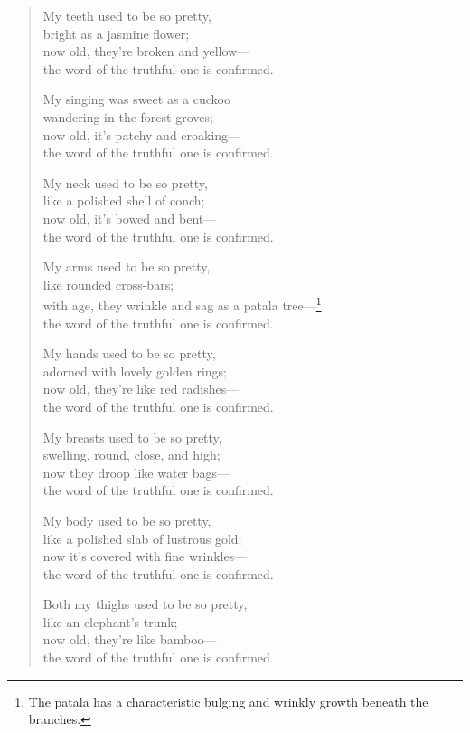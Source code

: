 \documentclass[12pt,openany]{book}%
\begin{document}
\begin{verse}
My teeth used to be so pretty, \\
bright as a jasmine flower; \\
now old, they’re broken and yellow—\\
the word of the truthful one is confirmed. 

My singing was sweet as a cuckoo \\
wandering in the forest groves; \\
now old, it’s patchy and croaking—\\
the word of the truthful one is confirmed. 

My neck used to be so pretty, \\
like a polished shell of conch; \\
now old, it’s bowed and bent—\\
the word of the truthful one is confirmed. 

My arms used to be so pretty, \\
like rounded cross-bars; \\
with age, they wrinkle and sag as a patala tree—\footnote{The patala has a characteristic bulging and wrinkly growth beneath the branches. } \\
the word of the truthful one is confirmed. 

My hands used to be so pretty, \\
adorned with lovely golden rings; \\
now old, they’re like red radishes—\\
the word of the truthful one is confirmed. 

My breasts used to be so pretty, \\
swelling, round, close, and high; \\
now they droop like water bags—\\
the word of the truthful one is confirmed. 

My body used to be so pretty, \\
like a polished slab of lustrous gold; \\
now it’s covered with fine wrinkles—\\
the word of the truthful one is confirmed. 

Both my thighs used to be so pretty, \\
like an elephant’s trunk; \\
now old, they’re like bamboo—\\
the word of the truthful one is confirmed. 


\end{verse}
\end{document}
